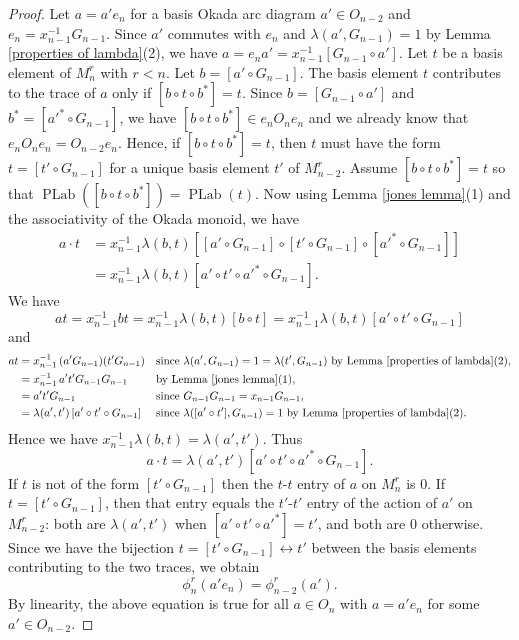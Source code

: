 \documentclass[12pt,reqno]{amsart}
\numberwithin{equation}{section}
\theoremstyle{definition}
\theoremstyle{definition}
\newcommand{\PLab}{\operatorname{PLab}}
\begin{document}
\begin{proof}
Let $a=a'e_n$ for a basis Okada arc diagram $a'\in O_{n-2}$ and
$e_n=x_{n-1}^{-1}G_{n-1}$. Since $a'$ commutes with $e_n$ and $\lambda(a', G_{n-1})=1$ by Lemma \ref{properties of lambda}(2), we have
$a=e_na'=x_{n-1}^{-1}[G_{n-1}\circ a']$.
Let $t$ be a basis element of $M_n^r$ with $r<n$. Let
$b=[a'\circ G_{n-1}]$. 
The basis element $t$ contributes to the trace of $a$ only if
$[b\circ t\circ b^*]=t$.
Since $b=[G_{n-1}\circ a']$ and
$b^*=[a'^*\circ G_{n-1}]$, we have
$[b\circ t\circ b^*]\in e_nO_ne_n$ and we already know that $e_nO_ne_n=O_{n-2}e_n$.
Hence, if $[b\circ t\circ b^*]=t$, then $t$ must have the form
$t=[t'\circ G_{n-1}]$ for a unique basis element $t'$ of $M_{n-2}^r$. Assume $[b\circ t\circ b^*]=t$ so that $\PLab([b\circ t\circ b^*])=\PLab(t)$. 
Now using Lemma \ref{jones lemma}(1) and the associativity of the Okada monoid, we have
\begin{equation*}
\begin{aligned}
a\cdot t
&= x_{n-1}^{-1}\lambda(b,t)
[[a'\circ G_{n-1}]\circ [t'\circ G_{n-1}]\circ [a'^*\circ G_{n-1}]]\\
&= x_{n-1}^{-1} \lambda(b,t)
[a'\circ t'\circ a'^*\circ G_{n-1}].
\end{aligned}
\end{equation*}
We have
\[
at =x_{n-1}^{-1} bt = x_{n-1}^{-1} \lambda(b,t)[b \circ t]= x_{n-1}^{-1}\lambda(b,t)[a' \circ t' \circ G_{n-1}] 
\] and 
\begin{align*}
at &= x_{n-1}^{-1}\,(a'G_{n-1})(t'G_{n-1})
   && \text{since } \lambda(a',G_{n-1})=1=\lambda(t',G_{n-1}) \text{ by Lemma \ref{properties of lambda}(2)},\\
   &= x_{n-1}^{-1}\,a't'G_{n-1}G_{n-1}
   && \text{by Lemma~\ref{jones lemma}(1)},\\
   &= a't'G_{n-1}
   && \text{since } G_{n-1}G_{n-1}=x_{n-1}G_{n-1},\\
   &= \lambda(a',t')\,[a'\circ t'\circ G_{n-1}]
   && \text{since } \lambda([a'\circ t'],G_{n-1})=1
      \text{ by Lemma~\ref{properties of lambda}(2)}.
\end{align*}
 Hence we have 
$x_{n-1}^{-1} \lambda(b,t)=\lambda(a',t')$.
Thus
\begin{equation*}
a\cdot t=
\lambda(a',t')
[a'\circ t'\circ a'^*\circ G_{n-1}].
\end{equation*}
If $t$ is not of the form $[t'\circ G_{n-1}]$ then the $t$-$t$ entry of $a$ on $M_n^r$ is $0$. If $t=[t'\circ G_{n-1}]$, then that entry equals the $t'$-$t'$ entry of the action of $a'$ on $M_{n-2}^r$: both are 
$\lambda(a',t')$ when $[a' \circ t' \circ a'^*]=t'$, and both are $0$ otherwise.
Since we have the bijection
$t=[t'\circ G_{n-1}]\leftrightarrow t'$
between the basis elements contributing to the two traces, we obtain
\begin{equation*}
\phi_n^r(a'e_n)=\phi_{n-2}^r(a').
\end{equation*} By linearity, the above equation is true for all $a \in O_n $ with $a=a'e_n$ for some $a' \in O_{n-2} $.
\end{proof}
\end{document}
